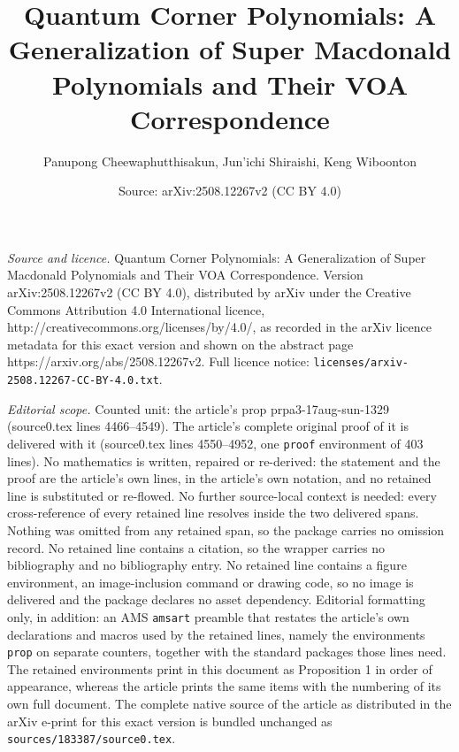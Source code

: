 \documentclass[10pt,a4paper]{amsart}
\title{Quantum Corner Polynomials: A Generalization of Super Macdonald Polynomials and Their VOA Correspondence}
\author{Panupong Cheewaphutthisakun, Jun'ichi Shiraishi, Keng Wiboonton}
\date{Source: arXiv:2508.12267v2 (CC BY 4.0)}
\begin{document}
\maketitle

\noindent\emph{Source and licence.} Quantum Corner Polynomials: A Generalization of Super Macdonald Polynomials and Their VOA Correspondence. Version arXiv:2508.12267v2 (CC BY 4.0), distributed by arXiv under the Creative Commons Attribution 4.0 International licence, http://creativecommons.org/licenses/by/4.0/, as recorded in the arXiv licence metadata for this exact version and shown on the abstract page https://arxiv.org/abs/2508.12267v2. Full licence notice: \texttt{licenses/arxiv-2508.12267-CC-BY-4.0.txt}.\par\smallskip

\noindent\textit{Editorial scope.} Counted unit: the article's prop prpa3-17aug-sun-1329 (source0.tex lines 4466--4549). The article's complete original proof of it is delivered with it (source0.tex lines 4550--4952, one \texttt{proof} environment of 403 lines). No mathematics is written, repaired or re-derived: the statement and the proof are the article's own lines, in the article's own notation, and no retained line is substituted or re-flowed.  No further source-local context is needed: every cross-reference of every retained line resolves inside the two delivered spans.  Nothing was omitted from any retained span, so the package carries no omission record.  No retained line contains a citation, so the wrapper carries no bibliography and no bibliography entry.  No retained line contains a figure environment, an image-inclusion command or drawing code, so no image is delivered and the package declares no asset dependency.  Editorial formatting only, in addition: an AMS \texttt{amsart} preamble that restates the article's own declarations and macros used by the retained lines, namely the environments \texttt{prop} on separate counters, together with the standard packages those lines need.  The retained environments print in this document as Proposition 1 in order of appearance, whereas the article prints the same items with the numbering of its own full document.  The complete native source of the article as distributed in the arXiv e-print for this exact version is bundled unchanged as \texttt{sources/183387/source0.tex}.
\end{document}
